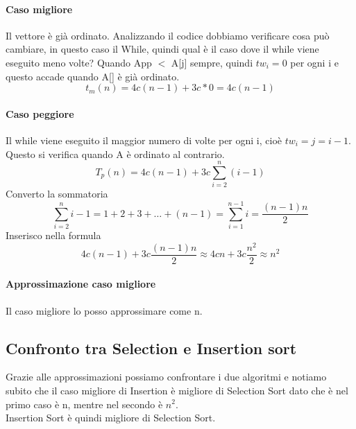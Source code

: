 \paragraph*{Caso migliore} Il vettore è già ordinato. Analizzando il codice dobbiamo
verificare cosa può cambiare, in questo caso il While, quindi qual è il caso dove
il while viene eseguito meno volte? Quando App $<$ A[j] sempre, quindi $tw_i = 0$ 
per ogni i e questo accade quando A[] è già ordinato.
\begin{equation*}
    t_m(n) = 4c(n-1)+3c*0=4c(n-1)
\end{equation*}
\paragraph*{Caso peggiore} Il while viene eseguito il maggior numero di volte per ogni
i, cioè $tw_i=j=i-1$. Questo si verifica quando A è ordinato al contrario.\\
\begin{equation*}
    T_p(n) = 4c(n-1)+3c \sum_{i=2}^n (i-1)
\end{equation*}
Converto la sommatoria
\begin{equation*}
    \sum_{i=2}^n i-1 = 1+2+3+\dots+(n-1) = \sum_{i=1}^{n-1}i = \frac{(n-1)n}{2}
\end{equation*}
Inserisco nella formula
\begin{equation*}
    4c(n-1)+3c \frac{(n-1)n}{2} \approx 4cn+3c \frac{n^2}{2} \approx n^2
\end{equation*}
\paragraph*{Approssimazione caso migliore} Il caso migliore lo posso approssimare come n.
\subsection{Confronto tra Selection e Insertion sort}
Grazie alle approssimazioni possiamo confrontare i due algoritmi e notiamo subito che
il caso migliore di Insertion è migliore di Selection Sort dato che è nel primo caso è n,
mentre nel secondo è $n^2$.\\
Insertion Sort è quindi migliore di Selection Sort.
